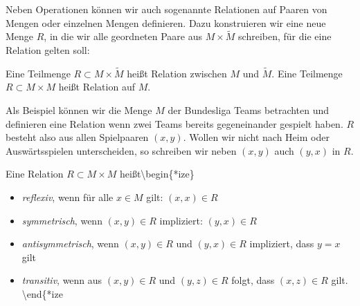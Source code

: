 Neben Operationen können wir auch sogenannte Relationen auf Paaren von Mengen oder einzelnen Mengen definieren. Dazu konstruieren wir eine neue Menge \(R\), in die wir alle geordneten Paare aus \(M \times \tilde M\) schreiben, für die eine Relation gelten soll:
\label{grundlagen/mengenlogik:definition-3}
\begin{definition}{}{}



Eine Teilmenge \(R \subset M \times \tilde M\) heißt Relation zwischen \(M\) und \(\tilde M\). Eine Teilmenge \(R \subset M \times M\) heißt Relation auf \(M\).
\end{definition}

Als Beispiel können wir die Menge \(M\) der Bundesliga Teams betrachten und definieren eine Relation wenn zwei Teams bereits gegeneinander gespielt haben. \(R\) besteht also aus allen Spielpaaren \((x,y)\). Wollen wir nicht nach Heim  oder Auswärtsspielen unterscheiden, so schreiben wir neben \((x,y)\) auch \((y,x)\) in \(R\).
\label{grundlagen/mengenlogik:definition-4}
\begin{definition}{}{}



Eine Relation \(R \subset M \times M\) heißt\textbackslash{}begin\{*ize\}
\begin{itemize}
\item {} 
\emph{reflexiv}, wenn für alle \(x \in M\) gilt: \((x,x) \in R\)

\item {} 
\emph{symmetrisch}, wenn \((x,y) \in R\) impliziert: \((y,x) \in R\)

\item {} 
\emph{antisymmetrisch}, wenn \((x,y) \in R\) und \((y,x) \in R\) impliziert, dass \(y=x\) gilt

\item {} 
\emph{transitiv}, wenn aus \((x,y) \in R\) und \((y,z) \in R\) folgt, dass \((x,z)  \in R\) gilt.
\textbackslash{}end\{*ize

\end{itemize}
\end{definition}

